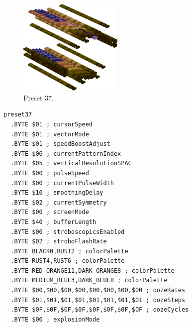 \begin{minipage}[b]{0.48\linewidth}
\begin{figure}[H]                                                          
  \centering                                                             
  \begin{adjustbox}{width=5cm,center}                                   
  \includegraphics[width=5cm]{src/colorspace_presets/preset37-45.png}%
  \end{adjustbox}                                                        
\caption*{Preset 37.}                                           
\end{figure}                                                               
\end{minipage}
\hspace{0.1cm}
\begin{minipage}[b]{0.48\linewidth}                                       
\begin{lstlisting}[basicstyle=\ttfamily\tiny]
preset37
  .BYTE $01 ; cursorSpeed
  .BYTE $01 ; vectorMode
  .BYTE $01 ; speedBoostAdjust
  .BYTE $06 ; currentPatternIndex
  .BYTE $05 ; verticalResolutionSPAC
  .BYTE $00 ; pulseSpeed
  .BYTE $00 ; currentPulseWidth
  .BYTE $10 ; smoothingDelay
  .BYTE $02 ; currentSymmetry
  .BYTE $00 ; screenMode
  .BYTE $40 ; bufferLength
  .BYTE $00 ; stroboscopicsEnabled
  .BYTE $02 ; stroboFlashRate
  .BYTE BLACK0,RUST2 ; colorPalette
  .BYTE RUST4,RUST6 ; colorPalette
  .BYTE RED_ORANGE11,DARK_ORANGE8 ; colorPalette
  .BYTE MEDIUM_BLUE3,DARK_BLUE8 ; colorPalette
  .BYTE $00,$00,$00,$00,$00,$00,$00,$00 ; oozeRates
  .BYTE $01,$01,$01,$01,$01,$01,$01,$01 ; oozeSteps
  .BYTE $0F,$0F,$0F,$0F,$0F,$0F,$0F,$0F ; oozeCycles
  .BYTE $00 ; explosionMode
\end{lstlisting}
\end{minipage}

